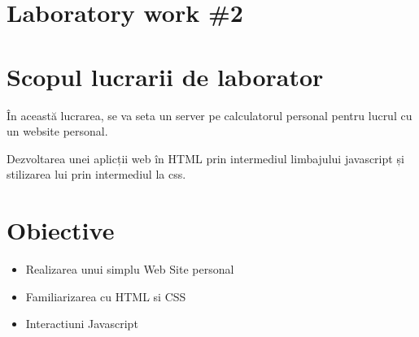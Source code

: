 \section*{Laboratory work \#2}

\section{Scopul lucrarii de laborator}
	În această lucrarea, se va seta un server pe calculatorul personal pentru lucrul cu un website personal. \par 
	Dezvoltarea unei aplicții web în HTML prin intermediul limbajului javascript și stilizarea lui prin intermediul la css.
	
\section{Obiective}

	\begin{itemize}
		\item Realizarea unui simplu Web Site personal
		\item Familiarizarea cu HTML si CSS
		\item Interactiuni Javascript
	\end{itemize}

\clearpage